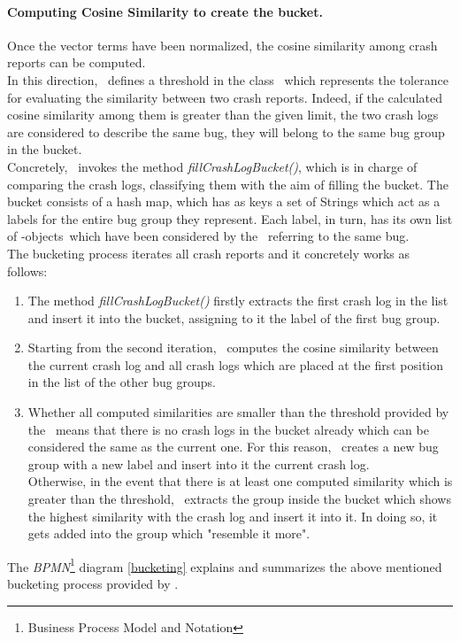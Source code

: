 \paragraph{Computing Cosine Similarity to create the bucket.}
Once the vector terms have been normalized, the cosine similarity among crash reports can be computed. \\
In this direction, \toolname\ defines a threshold in the class \Oracle\,  which represents the tolerance for evaluating the similarity between two crash reports. Indeed, if the calculated cosine similarity among them is greater than the given limit, the two crash logs are considered to describe the same bug, \ie they will belong to the same bug group in the bucket. \\
Concretely, \toolname\ invokes the method \textit{fillCrashLogBucket()}, which is in charge of comparing the crash logs, classifying them with the aim of filling the bucket. 
The bucket consists of a hash map, which has as keys a set of Strings which act as a labels for the entire bug group they represent. Each label, in turn, has its own list of \Crash-objects\, which have been considered by the \Oracle\ referring to the same bug.  \\
The bucketing process iterates all crash reports and it concretely works as follows: 
\begin{enumerate}
\item The method \textit{fillCrashLogBucket()} firstly extracts the first crash log in the list and insert it into the bucket, assigning to it the label of the first bug group. 
\item Starting from the second iteration, \toolname\ computes the cosine similarity between the current crash log and all crash logs which are placed at the first position in the list of the other bug groups. 
\item Whether all computed similarities are smaller than the threshold provided by the \Oracle\, means that there is no crash logs in the bucket already which can be considered the same as the current one. For this reason, \toolname\ creates a new bug group with a new label and insert into it the current crash log. \\
Otherwise, in the event that there is at least one computed similarity which is greater than the threshold, \toolname\ extracts the group inside the bucket which shows the highest similarity with the crash log and insert it into it.
In doing so, it gets added into the group which "resemble it more". 
\end{enumerate}
The \textit{BPMN}\footnote{Business Process Model and Notation} diagram \ref{bucketing} explains and summarizes the above mentioned bucketing process provided by \toolname. \\

